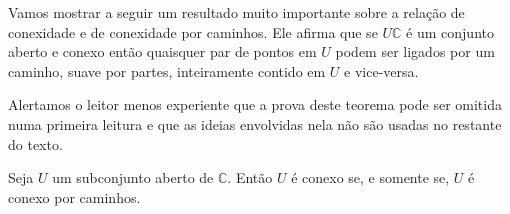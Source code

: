 \medskip 

Vamos mostrar a seguir um resultado muito importante sobre a relação de conexidade e de 
conexidade por caminhos. Ele afirma que se $U\mathbb{C}$ é um 
conjunto aberto e conexo então 
quaisquer par de pontos em $U$ podem ser ligados por um caminho, suave por partes, inteiramente 
contido em $U$ e vice-versa. 

Alertamos o leitor menos experiente que a prova deste teorema pode ser omitida numa primeira
leitura e que as ideias envolvidas nela não são usadas no restante do texto.

\begin{teorema}\label{teo-conexo-conexo-caminhos}
Seja $U$ um subconjunto aberto  de $\mathbb{C}$. Então $U$ é conexo se, e somente se, 
$U$ é conexo por caminhos.
\end{teorema}


